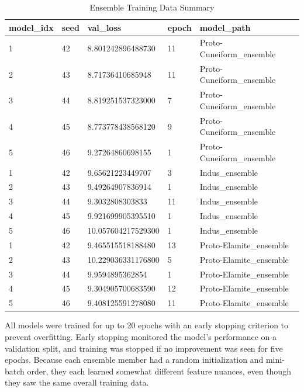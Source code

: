 \documentclass[11pt,a4paper,oneside]{report}
\begin{document}
\begin{table}[H]
    \centering
    \caption{Ensemble Training Data Summary}
    \label{tab:summary}
    \begin{tabular}{|l|l|l|l|l|}
    \hline
        \textbf{model\_idx} & \textbf{seed} & \textbf{val\_loss} & \textbf{epoch} & \textbf{model\_path} \\ \hline
        1 & 42 & 8.801242896488730 & 11 & Proto-Cuneiform\_ensemble \\ \hline
        2 & 43 & 8.71736410685948 & 11 & Proto-Cuneiform\_ensemble \\ \hline
        3 & 44 & 8.819251537323000 & 7 & Proto-Cuneiform\_ensemble \\ \hline
        4 & 45 & 8.773778438568120 & 9 & Proto-Cuneiform\_ensemble \\ \hline
        5 & 46 & 9.27264860698155 & 1 & Proto-Cuneiform\_ensemble \\ \hline
        1 & 42 & 9.65621223449707 & 3 & Indus\_ensemble \\ \hline
        2 & 43 & 9.49264907836914 & 1 & Indus\_ensemble \\ \hline
        3 & 44 & 9.3032808303833 & 11 & Indus\_ensemble \\ \hline
        4 & 45 & 9.921699905395510 & 1 & Indus\_ensemble \\ \hline
        5 & 46 & 10.057604217529300 & 1 & Indus\_ensemble \\ \hline
        1 & 42 & 9.465515518188480 & 13 & Proto-Elamite\_ensemble \\ \hline
        2 & 43 & 10.229036331176800 & 5 & Proto-Elamite\_ensemble \\ \hline
        3 & 44 & 9.9594895362854 & 1 & Proto-Elamite\_ensemble \\ \hline
        4 & 45 & 9.304905700683590 & 12 & Proto-Elamite\_ensemble \\ \hline
        5 & 46 & 9.408125591278080 & 11 & Proto-Elamite\_ensemble \\ \hline
    \end{tabular}
\end{table}

All models were trained for up to 20 epochs with an early stopping criterion to prevent overfitting. Early stopping monitored the model's performance on a validation split, and training was stopped if no improvement was seen for five epochs. Because each ensemble member had a random initialization and mini-batch order, they each learned somewhat different feature nuances, even though they saw the same overall training data.
\end{document}
